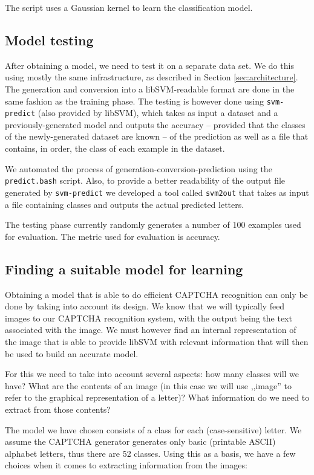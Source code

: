 \documentclass[a4paper,12pt]{article}
\begin{document}
The script uses a Gaussian kernel to learn the classification model.

\subsection*{Model testing}

After obtaining a model, we need to test it on a separate data set. We do this
using mostly the same infrastructure, as described in Section
\ref{sec:architecture}. The generation and conversion into a libSVM-readable
format are done in the same fashion as the training phase. The testing is
however done using \texttt{svm-predict} (also provided by libSVM), which takes
as input a dataset and a previously-generated model and outputs the accuracy --
provided that the classes of the newly-generated dataset are known -- of the
prediction as well as a file that contains, in order, the class of each example
in the dataset.

We automated the process of generation-conversion-prediction using the
\texttt{predict.bash} script. Also, to provide a better readability of the
output file generated by \texttt{svm-predict} we developed a tool called
\texttt{svm2out} that takes as input a file containing classes and outputs the
actual predicted letters.

The testing phase currently randomly generates a number of 100 examples used
for evaluation. The metric used for evaluation is accuracy.

\subsection*{Finding a suitable model for learning}

Obtaining a model that is able to do efficient CAPTCHA recognition can only be
done by taking into account its design. We know that we will typically feed
images to our CAPTCHA recognition system, with the output being the text
associated with the image. We must however find an internal representation of
the image that is able to provide libSVM with relevant information that will
then be used to build an accurate model.

For this we need to take into account several aspects: how many classes will we
have? What are the contents of an image (in this case we will use ,,image'' to
refer to the graphical representation of a letter)? What information do we need
to extract from those contents?

The model we have chosen consists of a class for each (case-sensitive) letter.
We assume the CAPTCHA generator generates only basic (printable ASCII) alphabet
letters, thus there are 52 classes. Using this as a basis, we have a few
choices when it comes to extracting information from the images:
\end{document}
